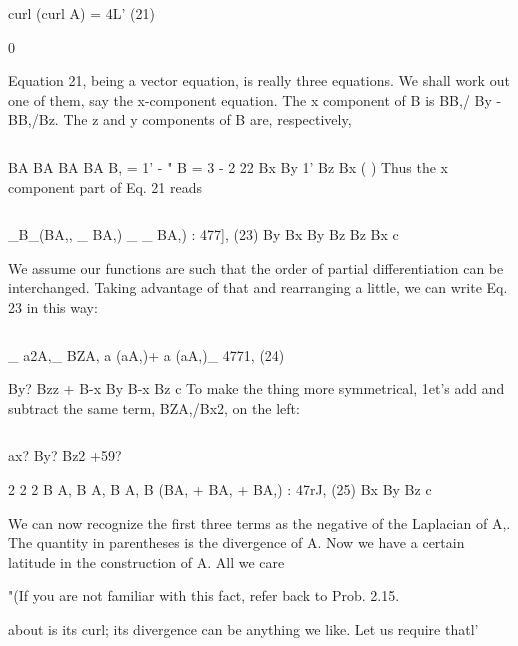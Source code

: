 \begin{equation}
\end{equation}
curl (curl A) = 4L' (21)

0

Equation 21, being a vector equation, is really three equations.
We shall work out one of them, say the x-component equation. The
x component of \curl B is BB,/ By - BB,/Bz. The z and y components
of B are, respectively,

\begin{equation}
\end{equation}


BA BA BA BA
B, = 1' - " B = 3 - 2 22
Bx By 1' Bz Bx ( )
Thus the x component part of Eq. 21 reads

\begin{equation}
\end{equation}

_B_(BA,, _ BA,) _  _ BA,) : 477], (23)
By Bx By Bz Bz Bx c

We assume our functions are such that the order of partial differentiation
can be interchanged. Taking advantage of that and rearranging
a little, we can write Eq. 23 in this way:

\begin{equation}
\end{equation}

_ a2A,_ BZA, a (aA,)+ a (aA,)_ 4771, (24)

By? Bzz + B-x By B-x Bz c
To make the thing more symmetrical, 1et's add and subtract the same
term, BZA,/Bx2, on the left:

\begin{equation}
\end{equation}

ax? By? Bz2 +59?

2 2 2
B A, B A, B A, B (BA, + BA, + BA,) : 47rJ, (25)
Bx By Bz c

We can now recognize the first three terms as the negative of the
Laplacian of A,. The quantity in parentheses is the divergence of A.
Now we have a certain latitude in the construction of A. All we care

"(If you are not familiar with this fact, refer back to Prob. 2.15.

about is its curl; its divergence can be anything we like. Let us
require thatl'

\begin{equation}
\end{equation}

